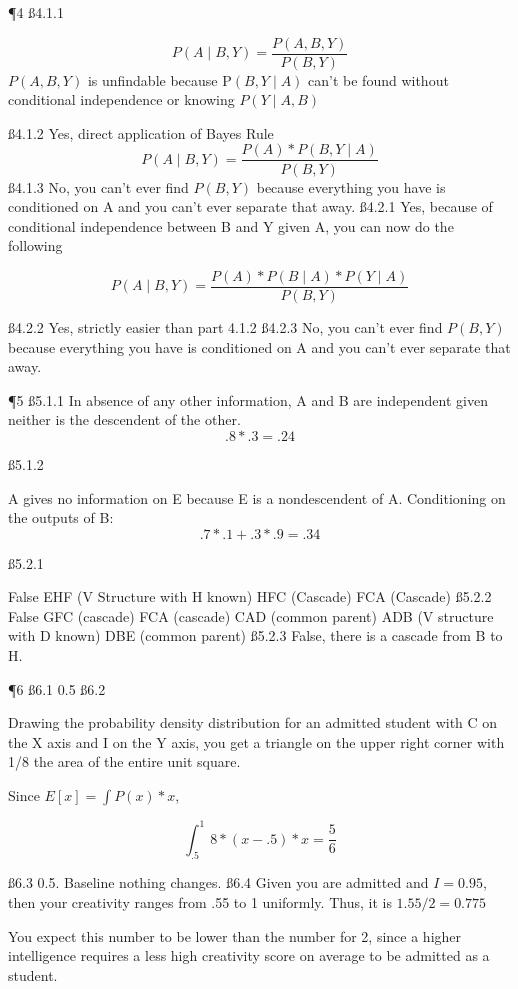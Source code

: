\P 4
\ss{4.1.1}

\[
 P(A \mid B,Y) = \frac{P(A,B,Y)}{ P(B,Y)}	
\]
$P(A,B,Y)$ is unfindable because P$(B,Y \mid A)$ can't be found without conditional independence or knowing $P(Y \mid A,B)$

\ss{4.1.2}
Yes, direct application of Bayes Rule
\[
P (A \mid B,Y) = \frac{P(A) * P(B,Y \mid A) } {P(B,Y)}
\]
\ss{4.1.3}
No, you can't ever find $P(B,Y)$ because everything you have is conditioned on A and you can't ever separate that away.
\ss{4.2.1}
Yes, because of conditional independence between B and Y given A, you can now do the following

\[
P (A \mid B,Y) = \frac{P(A) * P(B \mid A) * P(Y \mid A) } {P(B,Y)}
\]

\ss{4.2.2}
Yes, strictly easier than part 4.1.2
\ss{4.2.3}
No, you can't ever find $P(B,Y)$ because everything you have is conditioned on A and you can't ever separate that away.

\P 5
\ss{5.1.1}
In absence of any other information, A and B are independent given neither is the descendent of the other.
\[.8*.3 = .24\]

\ss{5.1.2}

A gives no information on E because E is a nondescendent of A. \newline \newline Conditioning on the outputs of B:
\[.7*.1 + .3*.9 = .34\]

\ss{5.2.1}

False
EHF (V Structure with H known)
HFC (Cascade)
FCA (Cascade)
\ss{5.2.2}
False
GFC (cascade)
FCA (cascade)
CAD (common parent)
ADB (V structure with D known)
DBE (common parent)
\ss{5.2.3}
False, there is a cascade from 	B to H.

\P 6
\ss{6.1}
0.5
\ss{6.2}

Drawing the probability density distribution for an admitted student with C on the X  axis and I on the Y axis, you get a triangle on the upper right corner with 1/8 the area of the entire unit square.

Since $E[x] = \int P(x) * x $,

\[
\int_{.5}^{1} 8*(x-.5) * x = \frac{5}{6}
\]

\ss{6.3}
0.5. Baseline nothing changes.
\ss{6.4}
Given you are admitted and $I = 0.95$, then your creativity ranges from .55 to 1 uniformly. Thus, it is $1.55/2 = 0.775$

You expect this number to be lower than the number for 2, since a higher intelligence requires a less high creativity score on average to be admitted as a student.

